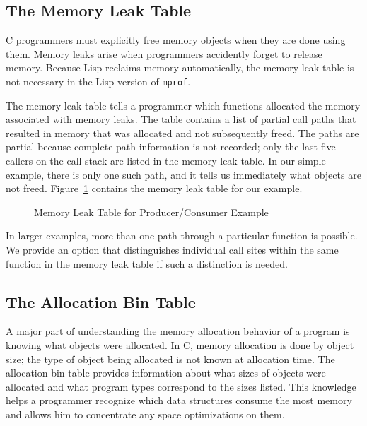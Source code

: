 
\subsection{The Memory Leak Table}

C programmers must explicitly free memory objects when they are done
using them.  Memory leaks arise when programmers accidently forget to
release memory.  Because Lisp reclaims memory automatically, the
memory leak table is not necessary in the Lisp version of {\tt mprof}.

The memory leak table tells a programmer which functions allocated the
memory associated with memory leaks.  The table contains a list of
partial call paths that resulted in memory that was allocated and not
subsequently freed.  The paths are partial because complete path
information is not recorded; only the last five callers on the call
stack are listed in the memory leak table.  In our simple example,
there is only one such path, and it tells us immediately what objects
are not freed.  Figure~\ref{memory leak figure} contains the memory
leak table for our example.

\begin{figure}[htbp]
\begin{singlespace}
{

}
\end{singlespace}
\caption{Memory Leak Table for Producer/Consumer Example}
\label{memory leak figure}
\end{figure}

In larger examples, more than one path through a particular function
is possible.  We provide an option that distinguishes individual call
sites within the same function in the memory leak table if such a
distinction is needed.

\subsection{The Allocation Bin Table}

A major part of understanding the memory allocation behavior of a
program is knowing what objects were allocated.  In C, memory
allocation is done by object size; the type of object being allocated
is not known at allocation time.  The allocation bin table provides
information about what sizes of objects were allocated and what
program types correspond to the sizes listed.  This knowledge helps a
programmer recognize which data structures consume the most memory and
allows him to concentrate any space optimizations on them.


